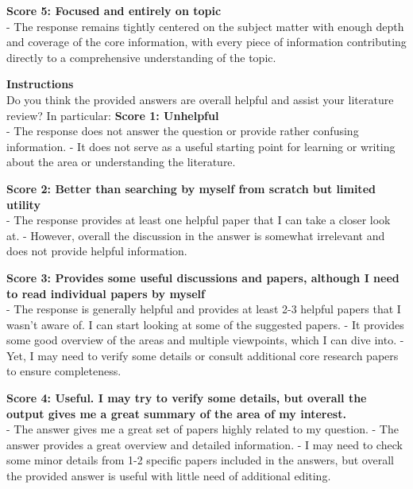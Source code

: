 \begin{table}[h!]
\begin{tcolorbox}[colback=blue!5!white,colframe=blue!75!black]
{\bf Score 5: Focused and entirely on topic }\\
- The response remains tightly centered on the subject matter with enough depth and coverage of the core information, with every piece of information contributing directly to a comprehensive understanding of the topic.
\end{tcolorbox}
\caption{\label{tab:rubrics_relevance} {\bf Evaluation rubrics for relevance.} The evaluation instructions and five-point rubric for assessing relevance. }
\end{table}

\begin{table}[h!]
\begin{tcolorbox}
{\bf Instructions}\\ 
Do you think the provided answers are overall helpful and assist your literature review? In particular:
\tcblower
{\bf Score 1: Unhelpful}\\
- The response does not answer the question or provide rather confusing information. 
- It does not serve as a useful starting point for learning or writing about the area or understanding the literature. 


{\bf Score 2: Better than searching by myself from scratch but limited utility  }\\
- The response provides at least one helpful paper that I can take a closer look at. 
- However, overall the discussion in the answer is somewhat irrelevant and does not provide helpful information. 

{\bf Score 3: Provides some useful discussions and papers, although I need to read individual papers by myself}\\
- The response is generally helpful and provides at least 2-3 helpful papers that I wasn’t aware of. I can start looking at some of the suggested papers. 
- It provides some good overview of the areas and multiple viewpoints, which I can dive into. 
- Yet, I may need to verify some details or consult additional core research papers to ensure completeness. 

{\bf Score 4: Useful. I may try to verify some details, but overall the output gives me a great summary of the area of my interest.}\\
- The answer gives me a great set of papers highly related to my question. 
- The answer provides a great overview and detailed information.
- I may need to check some minor details from 1-2 specific papers included in the answers, but overall the provided answer is useful with little need of additional editing. 


\end{tcolorbox}
\end{table}
